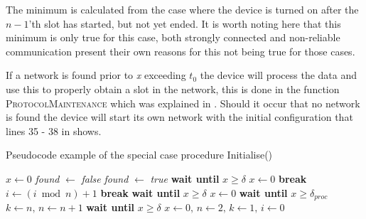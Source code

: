 The minimum is calculated from the case where the device is turned on after the $n-1$'th slot has started, but not yet ended.
It is worth noting here that this minimum is only true for this case, both strongly connected and non-reliable communication present their own reasons for this not being true for those cases.

If a network is found prior to \textit{x} exceeding $t_0$ the device will process the data and use this to properly obtain a slot in the network, this is done in the function \textsc{ProtocolMaintenance} which was explained in .
Should it occur that no network is found the device will start its own network with the initial configuration that lines 35 - 38 in  shows.

\begin{algorithm}[p]
\caption{Pseudocode example of the special case procedure Initialise()}
\label{lst:setupCCRC}
\begin{algorithmic}[1]
    \State $x \gets 0$
    \State \textit{found} $\gets$ \textit{false}
            \State {} 
            \State \textit{found} $\gets$ \textit{true}
            \State \textbf{wait until } $x \ge \delta$
            \State $x \gets 0$
            \State \textbf{break}
        \EndIf                                        
    \EndWhile
            \State $i \gets (i \bmod n) + 1$
                    \State {}
                    \State \textbf{break}
                \EndIf
            \EndWhile
            \State \textbf{wait until } $x \ge \delta$
            \State $x \gets 0$ 
        \EndWhile
        \State \textbf{wait until } $x \ge \delta_{proc}$
        \State $k \gets n,\, n \gets n+1$ 
        \State {}  
        \State \textbf{wait until } $x \ge \delta$ 
    \Else
        \State $x \gets 0,\, n \gets 2,\, k \gets 1,\, i \gets 0$ 
    \EndIf
    \State {} 
\EndProcedure        
\end{algorithmic}    
\end{algorithm} 

